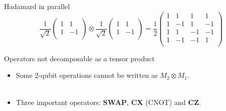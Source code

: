 \documentclass[aspectratio=169,12pt]{beamer}
\begin{document}
\begin{frame}{Hadamard in parallel}
  \begin{equation*}
    \frac{1}{\sqrt{2}}
    \begin{pmatrix}
      1 &  1 \\
      1 & -1 \\
    \end{pmatrix}
    \otimes
    \frac{1}{\sqrt{2}}
    \begin{pmatrix}
      1 &  1 \\
      1 & -1 \\
    \end{pmatrix}
    = 
    \frac{1}{2}
    \begin{pmatrix}
      1 &  1 &  1 &  1 \\
      1 & -1 &  1 & -1 \\
      1 &  1 & -1 & -1 \\
      1 & -1 & -1 &  1 \\
    \end{pmatrix}
  \end{equation*}
\end{frame}

\begin{frame}{Operators not decomposable as a tensor product}
  \begin{itemize}[<+->]
    \setlength{\itemsep}{0.6em}
    \item Some 2-qubit operations cannot be written as $M_2 \otimes M_1$.
    \\~\\
    \item Three important operators: \textbf{SWAP}, \textbf{CX} (CNOT) and \textbf{CZ}.
  \end{itemize}
\end{frame}
\end{document}
